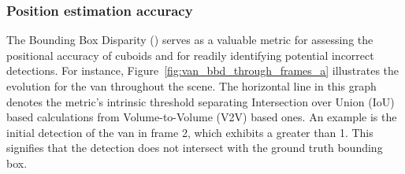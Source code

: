 \subsubsection{Position estimation accuracy}
The Bounding Box Disparity () serves as a valuable metric for assessing the positional accuracy of cuboids and for readily identifying potential incorrect detections. For instance, Figure~\ref{fig:van_bbd_through_frames_a} illustrates the  evolution for the van throughout the scene. The horizontal line in this graph denotes the  metric's intrinsic threshold separating Intersection over Union (IoU) based calculations from Volume-to-Volume (V2V) based ones. An example is the initial detection of the van in frame 2, which exhibits a  greater than 1. This signifies that the detection does not intersect with the ground truth bounding box. 


